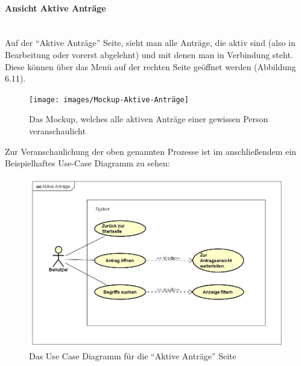 \paragraph{Ansicht Aktive Anträge}
~\\
Auf der \enquote{Aktive Anträge} Seite, sieht man alle Anträge, die aktiv sind (also in Bearbeitung oder vorerst abgelehnt) und mit denen man in Verbindung steht. Diese können über das Menü auf der rechten Seite geöffnet werden (Abbildung 6.11).
\begin{figure}[H]
	\centering
	\texttt{[image: images/Mockup-Aktive-Anträge]}
	\caption[Mokup aktive Anträge]{Das Mockup, welches alle aktiven Anträge einer gewissen Person veranschaulicht}
	\label{fig:mockupAktive}
\end{figure}
Zur Veranschaulichung der oben genannten Prozesse ist im anschließendem ein Beispielhaftes Use-Case Diagramm zu sehen: 
\begin{figure}[H]
	\centering
	\includegraphics[width=1\linewidth]{images/uc-active}
	\caption[Use Case Diagramm Aktive Anträge]{Das Use Case Diagramm für die \enquote{Aktive Anträge} Seite}
	\label{fig:ucAktiv}
\end{figure}
\newpage
